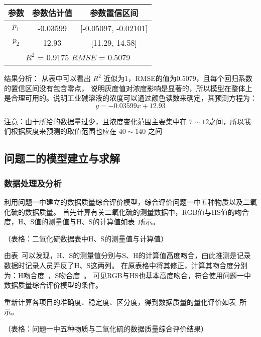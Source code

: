     \begin{table}[H]
        \centering
        \begin{tabular}{|c|c|c|}
            \hline
            参数     & 参数估计值  & 参数置信区间        \\ 
            \hline
            $p_1$  & -0.03599 & [-0.05097, -0.02101] \\
            \hline
            $p_2$  & 12.93  & [11.29, 14.58]   \\
            \hline
            \multicolumn{3}{|c|}{$R^2$ = 0.9175 $RMSE$ = 0.5079}  \\                                            
            \hline
        \end{tabular}
        \end{table}

    结果分析： 从表中可以看出 $R^2$ 近似为1，RMSE的值为0.5079，且每个回归系数的置信区间没有包含零点，
    说明灰度值对浓度影响是显著的，所以模型在整体上是合理可用的。说明工业碱溶液的浓度可以通过颜色读数来确定，其预测方程为：
        $$y = -0.03599 x + 12.93 $$

    注意：由于所给的数据量过少，且浓度变化范围主要集中在 $7 \sim 12$之间，所以我们根据灰度来预测的取值范围也应在 $40 \sim 140$
    之间



\subsection{问题二的模型建立与求解}

\subsubsection{数据处理及分析}

利用问题一中建立的数据质量综合评价模型，综合评价问题一中五种物质以及二氧化硫的数据质量。
首先计算有关二氧化硫的测量数据中，RGB值与HS值的吻合度，H、S值的测量值与H、S的计算值如表~所示。

（表格：二氧化硫数据表中H、S的测量值与计算值）

由表~可以发现，H、S的测量值分别与S、H的计算值高度吻合，由此推测是记录数据时记录人员弄反了H、S这两列。
在原表格中将其修正，计算其吻合度分别为：H吻合度~，S吻合度~。
可见RGB与HS也基本高度吻合，符合使用问题一中数据质量综合评价模型的条件。

重新计算各项目的准确度、稳定度、区分度，得到数据质量的量化评价如表~所示。

（表格：问题一中五种物质与二氧化硫的数据质量综合评价结果）

